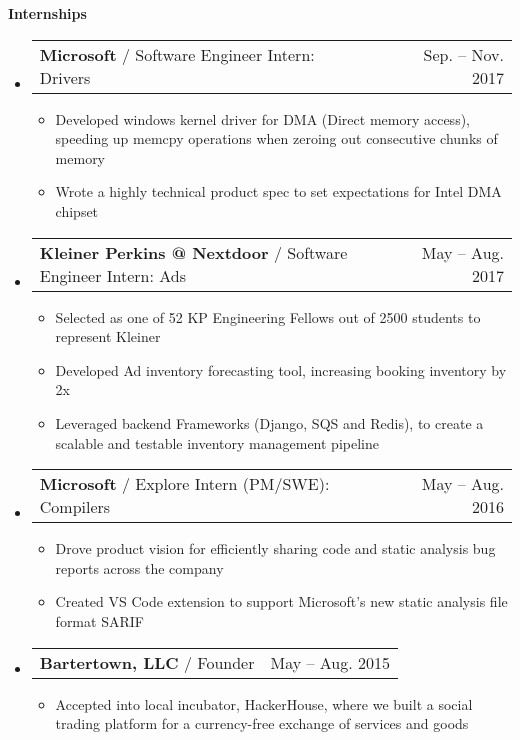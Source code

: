 \documentclass[letterpaper,11pt]{article}
\makeatletter
\newcommand{\resitem}[1]{\item #1 \vspace{-3pt}}
\newcommand{\resheading}[1]{{\large \colorbox{mygrey}{\begin{minipage}{\textwidth}{\textbf{#1 \vphantom{p\^{E}}}}\end{minipage}}}}
\newcommand{\ressubheading}[4]{
\begin{tabular*}{7.0in}{l@{\extracolsep{\fill}}r}
		\textbf{#1} & #2 \\
		\textit{#3} & \textit{#4} \\
\end{tabular*}\vspace{-6pt}}
\newcommand{\singlesubheading}[3]{
\begin{tabular*}{7.0in}{l@{\extracolsep{\fill}}r}
        \textbf{#1} / #2 & #3
\end{tabular*}\vspace{-2pt}}
\makeatother
\begin{document}
\resheading{Internships}
\begin{itemize}
\item[]
	\singlesubheading{Microsoft}{Software Engineer Intern: Drivers}{Sep. -- Nov. 2017}
    \begin{itemize}
    \resitem{Developed windows kernel driver for DMA (Direct memory access), speeding up memcpy operations when zeroing out consecutive chunks of memory}
    \resitem{Wrote a highly technical product spec to set expectations for Intel DMA chipset}
	\end{itemize}
\item[]
	\singlesubheading{Kleiner Perkins @ Nextdoor}{Software Engineer Intern: Ads}{May -- Aug. 2017}
	\begin{itemize}
        \resitem{Selected as one of 52 KP Engineering Fellows out of 2500 students to represent Kleiner}
        \resitem{Developed Ad inventory forecasting tool, increasing booking inventory by 2x}
        \resitem{Leveraged backend Frameworks (Django, SQS and Redis), to create a scalable and testable inventory management pipeline}
    \end{itemize}
\item[]
	\singlesubheading{Microsoft}{Explore Intern (PM/SWE): Compilers}{May -- Aug. 2016}
    \begin{itemize}
        \resitem{Drove product vision for efficiently sharing code and static analysis bug reports across the company}
		\resitem{Created VS Code extension to support Microsoft's new static analysis file format SARIF}
    \end{itemize}
\item[]
	\singlesubheading{Bartertown, LLC}{Founder}{May -- Aug. 2015}
    \begin{itemize}
        \resitem{Accepted into local incubator, HackerHouse, where we built a social trading platform for a currency-free exchange of services and goods}
    \end{itemize}

\end{itemize}
\end{document}

